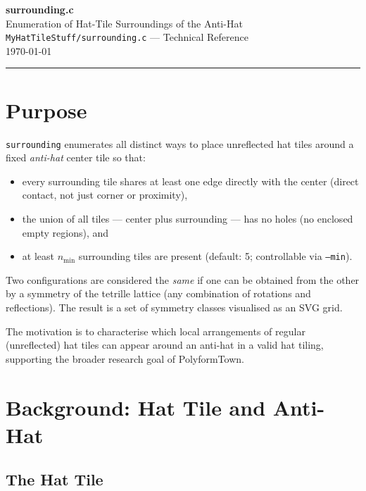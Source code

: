 \documentclass[10pt,a4paper]{article}
\let\polysection\section
\renewcommand\section{\needspace{0.16\textheight}\polysection}
\let\polysubsection\subsection
\renewcommand\subsection{\needspace{0.12\textheight}\polysubsection}
\newcommand{\code}[1]{\texttt{\small #1}}
\newcommand{\file}[1]{\texttt{\footnotesize #1}}
\begin{document}
\begin{center}
  {\Huge\bfseries\color{titlecolor} surrounding.c}\\[4pt]
  {\large\color{headercolor} Enumeration of Hat-Tile Surroundings of the Anti-Hat}\\[6pt]
  {\small \file{MyHatTileStuff/surrounding.c} — Technical Reference}\\[2pt]
  {\small\color{gray} \today}
\end{center}

\vspace{6pt}
\noindent\rule{\linewidth}{1pt}
\vspace{4pt}

\section{Purpose}

\code{surrounding} enumerates all distinct ways to place unreflected hat
tiles around a fixed \emph{anti-hat} center tile so that:
\begin{itemize}
  \item every surrounding tile shares at least one edge directly with
    the center (direct contact, not just corner or proximity),
  \item the union of all tiles — center plus surrounding — has no holes
    (no enclosed empty regions), and
  \item at least \(n_{\min}\) surrounding tiles are present
    (default: 5; controllable via \code{--min}).
\end{itemize}

Two configurations are considered the \emph{same} if one can be obtained
from the other by a symmetry of the tetrille lattice (any combination of
rotations and reflections).  The result is a set of symmetry classes
visualised as an SVG grid.

The motivation is to characterise which local arrangements of regular
(unreflected) hat tiles can appear around an anti-hat in a valid hat
tiling, supporting the broader research goal of PolyformTown.

\section{Background: Hat Tile and Anti-Hat}

\subsection{The Hat Tile}
\end{document}
